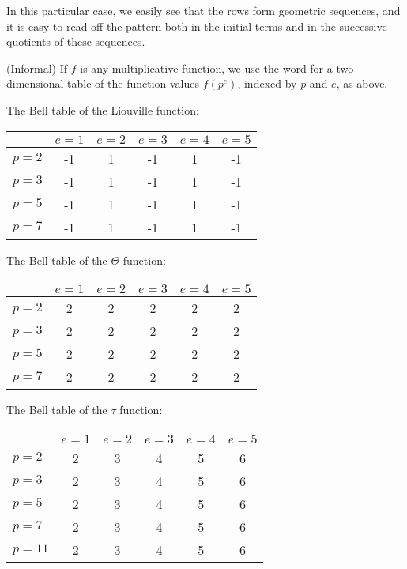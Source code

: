 In this particular case, we easily see that the rows form geometric sequences, and it is easy to read off the pattern both in the initial terms and in the successive quotients of these sequences. 

\begin{definition}
(Informal) If $f$ is any multiplicative function, we use the word  for a two-dimensional table of the function values $f(p^e)$, indexed by $p$ and $e$, as above.
\end{definition}

\begin{example}
The Bell table of the Liouville function:
\vskip10pt
\begin{center}
\begin{tabular}{| l | | c | c | c | c | c |}
\hline
& $e = 1$ & $e = 2$ & $e = 3$ & $e = 4$ & $e = 5$\\
\hline
\hline
$p = 2$ & -1 & 1 & -1 & 1 & -1 \\
\hline
$p = 3$ & -1 & 1 & -1 & 1 & -1 \\
\hline
$p = 5$ & -1 & 1 & -1 & 1 & -1 \\
\hline
$p = 7$ & -1 & 1 & -1 & 1 & -1 \\
\hline
\end{tabular}
\end{center}
\end{example}

\begin{example}
The Bell table of the $\Theta$ function:
\vskip10pt
\begin{center}
\begin{tabular}{| l | | c | c | c | c | c |}
\hline
& $e = 1$ & $e = 2$ & $e = 3$ & $e = 4$ & $e = 5$\\
\hline
\hline
$p = 2$ & 2 & 2 & 2 & 2 & 2 \\
\hline
$p = 3$ & 2 & 2 & 2 & 2 & 2 \\
\hline
$p = 5$ & 2 & 2 & 2 & 2 & 2 \\
\hline
$p = 7$ & 2 & 2 & 2 & 2 & 2 \\
\hline
\end{tabular}
\end{center}
\end{example}

\begin{example}
The Bell table of the $\tau$ function:
\vskip10pt
\begin{center}
\begin{tabular}{| l | | c | c | c | c | c |}
\hline
& $e = 1$ & $e = 2$ & $e = 3$ & $e = 4$ & $e = 5$\\
\hline
\hline
$p = 2$ & 2 & 3 & 4 & 5 & 6 \\
\hline
$p = 3$ & 2 & 3 & 4 & 5 & 6 \\
\hline
$p = 5$ & 2 & 3 & 4 & 5 & 6 \\
\hline
$p = 7$ & 2 & 3 & 4 & 5 & 6 \\
\hline
$p = 11$ & 2 & 3 & 4 & 5 & 6 \\
\hline
\end{tabular}
\end{center}
\end{example}


